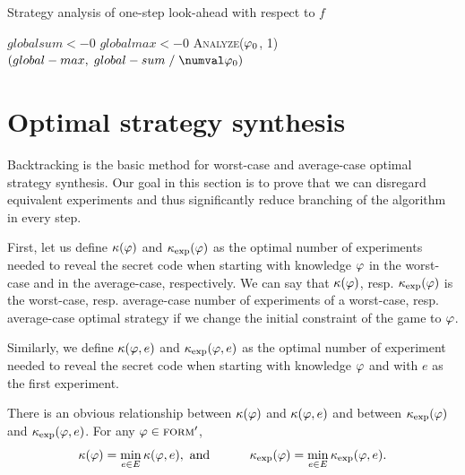 \begin{algorithm}[h]
\caption{Strategy analysis of one-step look-ahead with respect to $f$}
\label{alg:stganalysis}
\DontPrintSemicolon
$globalsum <- 0$\;
$globalmax <- 0$\;
\textsc{Analyze}($\varphi_0$, 1)\;
\Return$ (global-max,\; global-sum \;/\; \numval\init)$\\\hrulefill\;
\end{algorithm}

\section{Optimal strategy synthesis}

Backtracking is the basic method for worst-case and average-case
  optimal strategy synthesis.
Our goal in this section is to prove that we can disregard
  equivalent experiments and thus significantly
  reduce branching of the algorithm in every step.

\newcommand{\optval}{\kappa}
\newcommand{\optexp}{\varepsilon}
\newcommand{\optvale}{\kappa_\textrm{exp}}
\newcommand{\optexpe}{\varepsilon_\textrm{exp}}

First, let us define $\optval(\form)$ and $\optvale(\form)$ as
 the optimal number of experiments needed to reveal the secret code
  when starting with knowledge $\varphi$
  in the worst-case and in the average-case, respectively.
We can say that $\optval(\form)$, resp. $\optvale(\form)$ is
  the worst-case, resp. average-case number of experiments of
  a worst-case, resp. average-case optimal strategy
  if we change the initial constraint of the game to $\varphi$.

Similarly, we define $\optval(\form, e)$ and $\optvale(\form, e)$ as
  the optimal number of experiment needed to reveal the secret code
  when starting with knowledge $\varphi$ and
  with $e$ as the first experiment.

There is an obvious relationship between $\optval(\form)$ and $\optval(\form,e)$
  and between $\optvale(\form)$ and $\optvale(\form,e)$.
For any $\varphi\in{\textsc{form}'}$,
\begin{equation}
\optval(\form) = \min_{e\in\Exp}\optval(\form, e),\textrm{ and }
\hspace{1cm}
\optvale(\form) = \min_{e\in\Exp}\optvale(\form, e).
\label{opttriv}
\end{equation}

